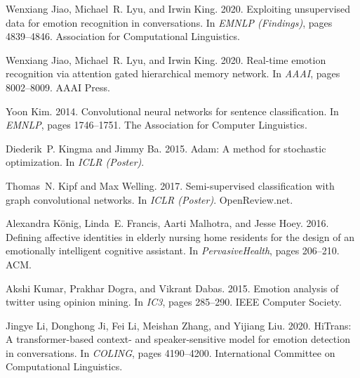 \documentclass[11pt,a4paper]{article}
\begin{document}
\begin{thebibliography}{45}
  Wenxiang Jiao, Michael~R. Lyu, and Irwin King. 2020{}.
  \newblock Exploiting unsupervised data for emotion recognition in
    conversations.
  \newblock In \emph{{EMNLP} (Findings)}, pages 4839--4846. Association for
    Computational Linguistics.
  
  Wenxiang Jiao, Michael~R. Lyu, and Irwin King. 2020{}.
  \newblock Real-time emotion recognition via attention gated hierarchical memory
    network.
  \newblock In \emph{{AAAI}}, pages 8002--8009. {AAAI} Press.
  
  Yoon Kim. 2014.
  \newblock Convolutional neural networks for sentence classification.
  \newblock In \emph{{EMNLP}}, pages 1746--1751. The Association for Computer
    Linguistics.
  
  Diederik~P. Kingma and Jimmy Ba. 2015.
  \newblock Adam: {A} method for stochastic optimization.
  \newblock In \emph{{ICLR} (Poster)}.
  
  Thomas~N. Kipf and Max Welling. 2017.
  \newblock Semi-supervised classification with graph convolutional networks.
  \newblock In \emph{{ICLR} (Poster)}. OpenReview.net.
  
  Alexandra K{\"{o}}nig, Linda~E. Francis, Aarti Malhotra, and Jesse Hoey. 2016.
  \newblock Defining affective identities in elderly nursing home residents for
    the design of an emotionally intelligent cognitive assistant.
  \newblock In \emph{PervasiveHealth}, pages 206--210. {ACM}.
  
  Akshi Kumar, Prakhar Dogra, and Vikrant Dabas. 2015.
  \newblock Emotion analysis of twitter using opinion mining.
  \newblock In \emph{{IC3}}, pages 285--290. {IEEE} Computer Society.
  
  Jingye Li, Donghong Ji, Fei Li, Meishan Zhang, and Yijiang Liu. 2020.
  \newblock Hi{T}rans: {A} transformer-based context- and speaker-sensitive model
    for emotion detection in conversations.
  \newblock In \emph{{COLING}}, pages 4190--4200. International Committee on
    Computational Linguistics.
  

\end{thebibliography}
\end{document}
